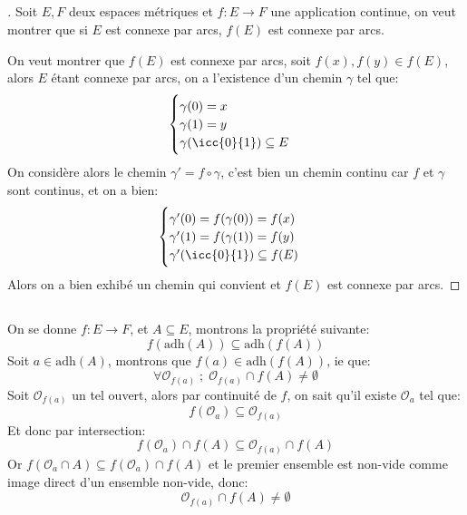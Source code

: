 \documentclass{report}
\begin{document}
      \subsection*{}
      \begin{proof}[\unskip\nopunct]
         Soit \(E, F\) deux espaces métriques et \(f : E \rightarrow F\) une application continue, on veut montrer que si \(E\) est connexe par arcs, \(f(E)\) est connexe par arcs.\<

         On veut montrer que \(f(E)\) est connexe par arcs, soit \(f(x), f(y) \in f(E)\), alors \(E\) étant connexe par arcs, on a l'existence d'un chemin \(\gamma\) tel que:
         \[
            \begin{cases}
               \gamma(0) = x \\
               \gamma(1) = y \\
               \gamma(\icc{0}{1}) \subseteq E
            \end{cases}   
         \]
         On considère alors le chemin \(\gamma' = f \circ \gamma\), c'est bien un chemin continu car \(f\) et \(\gamma\) sont continus, et on a bien:
         \[
            \begin{cases}
               \gamma'(0) = f(\gamma(0)) = f(x) \\
               \gamma'(1) = f(\gamma(1)) = f(y) \\
               \gamma'(\icc{0}{1}) \subseteq f(E)
            \end{cases}   
         \]
         Alors on a bien exhibé un chemin qui convient et \(f(E)\) est connexe par arcs.
      \end{proof}

      \subsection*{}
      On se donne \(f : E \rightarrow F\), et \(A \subseteq E\), montrons la propriété suivante:
      \[
         f(\text{adh}(A)) \subseteq \text{adh}(f(A))
      \]
      Soit \(a \in \text{adh}(A)\), montrons que \(f(a) \in \text{adh}(f(A))\), ie que:
      \[
         \forall \mathcal{O}_{f(a)} \; ; \; \mathcal{O}_{f(a)} \cap f(A) \neq \emptyset
      \]
      Soit \(\mathcal{O}_{f(a)}\) un tel ouvert, alors par continuité de \(f\), on sait qu'il existe \(\mathcal{O}_{a}\) tel que:
      \[
         f(\mathcal{O}_{a}) \subseteq \mathcal{O}_{f(a)}
      \]
      Et donc par intersection:
      \[
         f(\mathcal{O}_{a}) \cap f(A) \subseteq \mathcal{O}_{f(a)} \cap f(A)
      \]
      Or \(f(\mathcal{O}_{a} \cap A) \subseteq f(\mathcal{O}_{a}) \cap f(A)\) et le premier ensemble est non-vide comme image direct d'un ensemble non-vide, donc:
      \[
         \mathcal{O}_{f(a)} \cap f(A) \neq \emptyset
      \]
\end{document}
